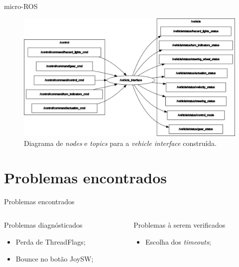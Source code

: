 \documentclass{if-beamer}
\begin{document}
\begin{frame}{micro-ROS}

	\begin{figure}[H]
		\centering
		\includegraphics[width=0.85\linewidth]{rosgraph}
		\caption{Diagrama de \textit{nodes} e \textit{topics} para a \textit{vehicle interface} construída.}
		\label{fig:rosgraph}
	\end{figure}

\end{frame}

\section{Problemas encontrados}

\begin{frame}{Problemas encontrados}
	
	\begin{columns}
		
		\begin{column}{0.5\textwidth}
			
			\begin{block}{Problemas diagnósticados}
				
				\begin{itemize}
					\item Perda de ThreadFlags;
					\item Bounce no botão JoySW;
					
				\end{itemize}
				
			\end{block}
			
		\end{column}
		
		\begin{column}{0.5\textwidth}
			
			\begin{block}{Problemas à serem verificados}
				
				\begin{itemize}
					\item Escolha dos \textit{timeouts};
					
				\end{itemize}
				
			\end{block}
			
		\end{column}
		
	\end{columns}
	
\end{frame}
\end{document}

